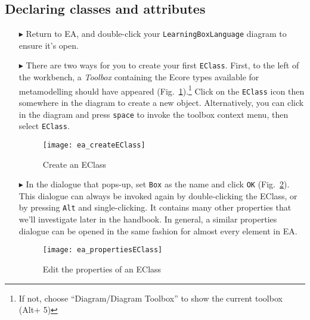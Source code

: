 \newpage
\subsection{Declaring classes and attributes}
\genHeader
\hypertarget{static:classes vis}{}

\begin{itemize}

\item[$\blacktriangleright$] Return to EA, and double-click your \texttt{LearningBoxLanguage} diagram to ensure it's open.

\vspace{0.5cm}

\item[$\blacktriangleright$] There are two ways for you to create your first \texttt{EClass}. First, to the left of the workbench, a \emph{Toolbox} containing
the Ecore types available for metamodelling should have appeared (Fig.~\ref{ea:eclass}).\footnote{If not, choose ``Diagram/Diagram Toolbox'' to show the
current toolbox (Alt+ 5)} Click on the \texttt{EClass} icon then somewhere in the diagram to create a new object. Alternatively, you can click in the diagram and press
\texttt{space} to invoke the toolbox context menu, then select \texttt{EClass}.

\vspace{0.5cm}

\begin{figure}[htbp]
	\centering
  \texttt{[image: ea\_createEClass]}
	\caption{Create an EClass}
	\label{ea:eclass}
\end{figure}

\vspace{0.5cm}

\item[$\blacktriangleright$] In the dialogue that pops-up, set \texttt{Box} as the name and click \texttt{OK} (Fig.~\ref{ea:eclass_properties}).
This dialogue can always be invoked again by double-clicking the EClass, or by pressing \texttt{Alt} and single-clicking. It contains many other properties that we'll investigate later in the handbook. In general, a similar properties dialogue can be opened in the same fashion for almost every element in EA.

\clearpage

\begin{figure}[ht]
	\centering
  \texttt{[image: ea\_propertiesEClass]}
	\caption{Edit the properties of an EClass}
	\label{ea:eclass_properties}
\end{figure}


\end{itemize}
